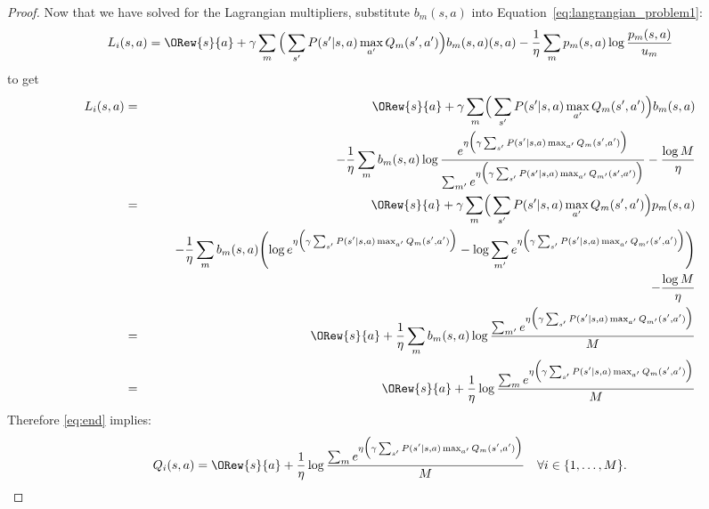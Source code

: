 \begin{theorem}
\begin{proof}
		Now that we have solved for the Lagrangian multipliers, substitute $b_m(s,a)$ into  Equation~\eqref{eq:langrangian_problem1}:
		\begin{eqnarray}
		L_i(s,a) = \ORew{s}{a}  + \gamma \sum_m \Big( \sum_{s'}P(s'|s,a)\max_{a'}Q_m(s',a') \Bigl) b_m(s,a)
		(s,a)-\frac{1}{\eta} \sum_m p_m(s,a) \log \frac{p_m(s,a)}{u_m}
		\end{eqnarray}
		to get
		\begin{eqnarray}
		L_i(s,a) & =& \ORew{s}{a}   + \gamma \sum_m \Bigr( \sum_{s'}P(s'|s,a)\max_{a'}Q_m(s',a') \Bigl) b_m(s,a)  \nonumber \\
		& & \quad \quad \quad - \frac{1}{\eta} \sum_m b_m(s,a) \log \frac{e^{\eta\Bigr( \gamma  \sum_{s'}P(s'|s,a)\max_{a'}Q_m(s',a') \Bigl)}}{\sum_{m'} e^{\eta \Bigr( \gamma  \sum_{s'}P(s'|s,a)\max_{a'}Q_{m'}(s',a') \Bigl)}}  - \frac{\log M}{\eta}  \nonumber \\
		& =& \ORew{s}{a}   + \gamma \sum_m\Bigr(  \sum_{s'}P(s'|s,a)\max_{a'}Q_m(s',a') \Bigl) p_m(s,a)\nonumber \\
		& & \quad \quad - \frac{1}{\eta} \sum_m  b_m(s,a) \Biggl( \log e^{\eta\Bigr( \gamma  \sum_{s'}P(s'|s,a)\max_{a'}Q_m(s',a') \Bigl)} - \log{\sum_{m'} e^{\eta \Bigr( \gamma  \sum_{s'}P(s'|s,a)\max_{a'}Q_{m'}(s',a') \Bigl)}}\Biggr)\nonumber \\
		& & \quad \quad \quad  - \frac{\log M}{\eta}  \nonumber \\
		& =& \ORew{s}{a}   + \frac{1}{\eta} \sum_m b_m(s,a) \log \frac{ \sum_{m'} e^{\eta \Bigr( \gamma  \sum_{s'}P(s'|s,a)\max_{a'}Q_{m'}(s',a') \Bigl)}}{M} \nonumber \\
		& = & \ORew{s}{a}   + \frac{1}{\eta} \log \frac{\sum_m e^{\eta \Bigr( \gamma  \sum_{s'}P(s'|s,a)\max_{a'}Q_m(s',a') \Bigl)}}{M}   \label{eq:end}
		\end{eqnarray}
		Therefore \eqref{eq:end} implies:
		\begin{equation}
		Q_i(s,a)  =   \ORew{s}{a}   + \frac{1}{\eta} \log \frac{ \sum_m e^{\eta \Bigr( \gamma  \sum_{s'}P(s'|s,a)\max_{a'}Q_m(s',a') \Bigl)} }{M}  \quad \forall i \in \{1, \dots, M\}. \nonumber 
		\end{equation}
	\end{proof}
\end{theorem}


